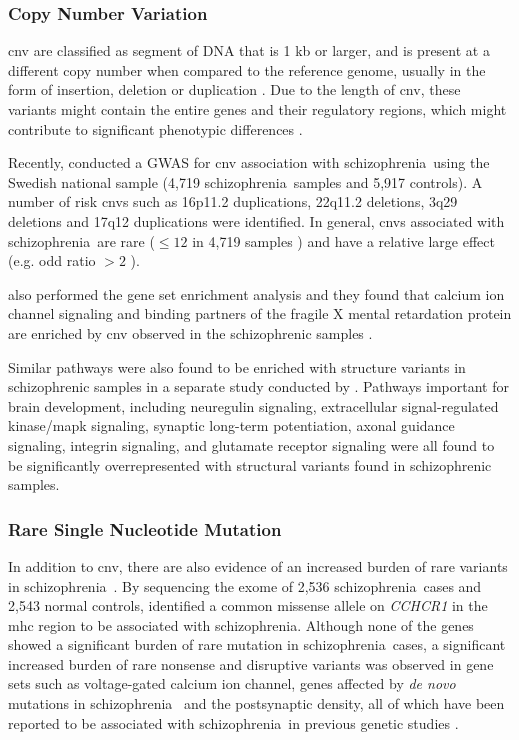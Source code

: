 \documentclass[12pt]{scrbook}
\newcommand*{\scz}{schizophrenia}
\begin{document}
\subsubsection{Copy Number Variation}
\gls{cnv} are classified as segment of DNA that is 1 \gls{kb} or larger, and is present at a different copy number when compared to the reference genome, usually in the form of insertion, deletion or duplication \citep{Feuk2006}.
Due to the length of \gls{cnv}, these variants might contain the entire genes and their regulatory regions, which might contribute to significant phenotypic differences \citep{Feuk2006}.
	
Recently, \citet{Szatkiewicz2014} conducted a \gls{GWAS} for \gls{cnv} association with \scz\ using the Swedish national sample (4,719 \scz\ samples and 5,917 controls).
A number of risk \glspl{cnv} such as 16p11.2 duplications, 22q11.2 deletions, 3q29 deletions and 17q12 duplications were identified.
In general, \glspl{cnv} associated with \scz\ are rare ($\le12$ in 4,719 samples \citep{Szatkiewicz2014}) and have a relative large effect (e.g. odd ratio $>2$ \citep{Szatkiewicz2014,Walsh2008}).

\citet{Szatkiewicz2014} also performed the gene set enrichment analysis and they found that calcium ion channel signaling and binding partners of the fragile X mental retardation protein are enriched by \gls{cnv} observed in the schizophrenic samples \citep{Szatkiewicz2014}.

Similar pathways were also found to be enriched with structure variants in schizophrenic samples in a separate study conducted by \citet{Walsh2008}.
Pathways important for brain development, including neuregulin signaling, extracellular signal-regulated kinase/\gls{mapk} signaling, synaptic long-term potentiation, axonal guidance signaling, integrin signaling, and glutamate receptor signaling were all found to be significantly overrepresented with structural variants found in schizophrenic samples.

\subsubsection{Rare Single Nucleotide Mutation}
In addition to \gls{cnv}, there are also evidence of an increased burden of rare variants in \scz\  \citep{purcell2014polygenic}. 
By sequencing the exome of 2,536 \scz\ cases and 2,543 normal controls,  \citet{purcell2014polygenic} identified a common missense allele on \textit{CCHCR1} in the \gls{mhc} region to be associated with \scz.
Although none of the genes showed a significant burden of rare mutation in \scz\ cases, a significant increased burden of rare nonsense and disruptive variants was observed in gene sets such as voltage-gated calcium ion channel, genes affected by \textit{de novo} mutations in \scz\ \citep{Fromer2014} and the postsynaptic density, all of which have been reported to be associated with \scz\ in previous genetic studies \citep{Ripke2014}.
\end{document}

